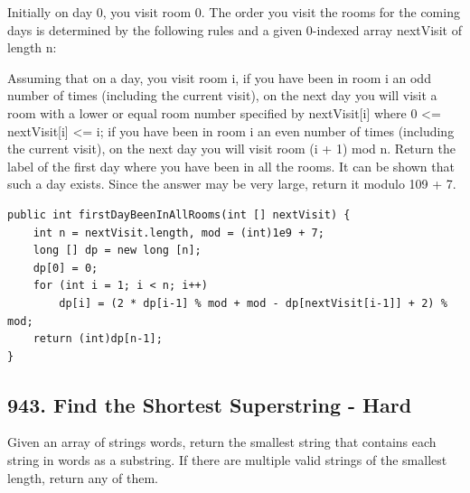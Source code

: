 \documentclass[9pt, b5paaper]{book}
\begin{document}
Initially on day 0, you visit room 0. The order you visit the rooms for the coming days is determined by the following rules and a given 0-indexed array nextVisit of length n:

Assuming that on a day, you visit room i,
if you have been in room i an odd number of times (including the current visit), on the next day you will visit a room with a lower or equal room number specified by nextVisit[i] where 0 <= nextVisit[i] <= i;
if you have been in room i an even number of times (including the current visit), on the next day you will visit room (i + 1) mod n.
Return the label of the first day where you have been in all the rooms. It can be shown that such a day exists. Since the answer may be very large, return it modulo 109 + 7.
\begin{verbatim}
public int firstDayBeenInAllRooms(int [] nextVisit) {
    int n = nextVisit.length, mod = (int)1e9 + 7;
    long [] dp = new long [n];
    dp[0] = 0;
    for (int i = 1; i < n; i++) 
        dp[i] = (2 * dp[i-1] % mod + mod - dp[nextVisit[i-1]] + 2) % mod;
    return (int)dp[n-1];
}
\end{verbatim}

\subsection{943. Find the Shortest Superstring - Hard}
\label{sec-1-4-56}
Given an array of strings words, return the smallest string that contains each string in words as a substring. If there are multiple valid strings of the smallest length, return any of them.
\end{document}
